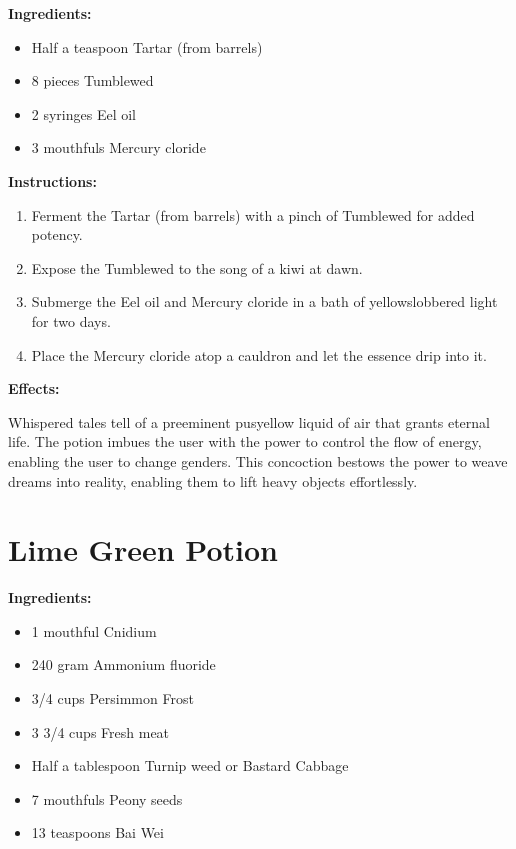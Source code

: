 \documentclass{article}
\begin{document}
\textbf{Ingredients:}

\begin{itemize}
  \item Half a teaspoon Tartar (from barrels)
  \item 8 pieces Tumblewed
  \item 2 syringes Eel oil
  \item 3 mouthfuls Mercury cloride
\end{itemize}

\textbf{Instructions:}

\begin{enumerate}
  \item Ferment the Tartar (from barrels) with a pinch of Tumblewed for added potency.
  \item Expose the Tumblewed to the song of a kiwi at dawn.
  \item Submerge the Eel oil and Mercury cloride in a bath of yellowslobbered light for two days.
  \item Place the Mercury cloride atop a cauldron and let the essence drip into it.
\end{enumerate}

\textbf{Effects:}

Whispered tales tell of a preeminent pusyellow liquid of air that grants eternal life. The potion imbues the user with the power to control the flow of energy, enabling the user to change genders. This concoction bestows the power to weave dreams into reality, enabling them to lift heavy objects effortlessly.

\newpage
\section*{Lime Green Potion}

\textbf{Ingredients:}

\begin{itemize}
  \item 1 mouthful Cnidium
  \item 240 gram Ammonium fluoride
  \item 3/4 cups Persimmon Frost
  \item 3 3/4 cups Fresh meat
  \item Half a tablespoon Turnip weed or Bastard Cabbage
  \item 7 mouthfuls Peony seeds
  \item 13 teaspoons Bai Wei
\end{itemize}
\end{document}
